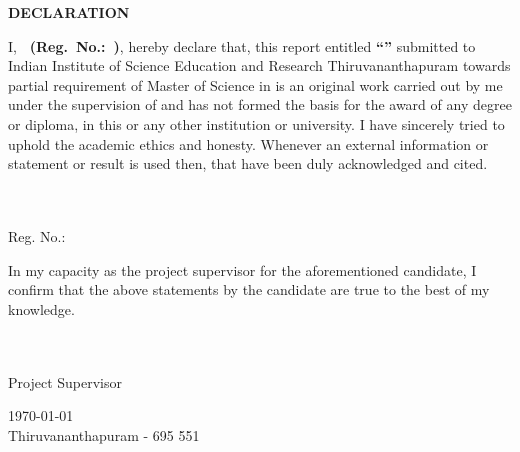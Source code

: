 \begin{center}
{\Large{\bf{DECLARATION}}}
\end{center}

\noindent

I, {\bf\ThesisAuthor\ (Reg.\ No.:\ \RegNumber)}, hereby declare that,
this report entitled {\bf``\ThesisTitle”} submitted to Indian
Institute of Science Education and Research Thiruvananthapuram towards
partial requirement of Master of Science in {\bf \Department} is an original
work carried out by me under the supervision of {\bf \ProjectSupervisor} and has
not formed the basis for the award of any degree or diploma, in this or any
other institution or university. I have sincerely tried to uphold the academic
ethics and honesty. Whenever an external information or statement or result
is used then, that have been duly acknowledged and cited.
\vspace{2.5cm}

\begin{flushright}
    \begin{minipage}[c]{0.4\textwidth}
    \centering
    \fillin[0.9\linewidth]\\
    {\large \bf \ThesisAuthor} \medskip\\
    {\large Reg. No.: \RegNumber}
    \end{minipage}
\end{flushright}
\vspace{0.8cm}
\noindent
In my capacity as the project supervisor for the aforementioned candidate, I confirm that the above statements by the candidate are true to the best of my knowledge.

\vspace{2.5cm}

\begin{flushright}
    \begin{minipage}[c]{0.4\textwidth}
    \centering
    \fillin[0.9\linewidth]\\
    {\large \bf \ProjectSupervisor} \medskip\\
    {\large Project Supervisor}
    \end{minipage}
\end{flushright}
\vfill
\noindent\today \\
Thiruvananthapuram - 695 551
\vspace{1.5cm}
\cleardoublepage
